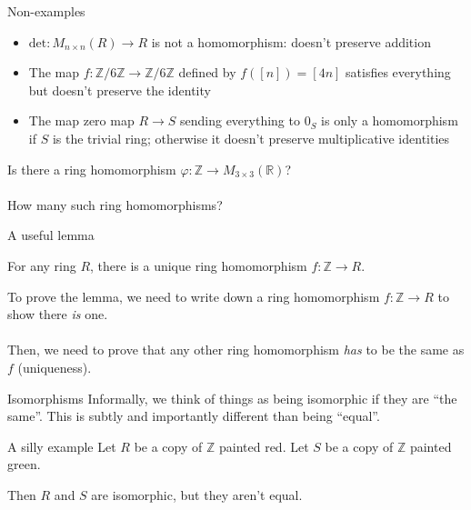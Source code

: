 \documentclass{beamer}
\newcommand{\Z}{\mathbb{Z}}
\newcommand{\R}{\mathbb{R}}
\begin{document}
\begin{frame}{Non-examples}
  \begin{itemize}
  \item $\text{det}: M_{n\times n}(R)\to R$ is not a homomorphism: doesn't preserve addition
  \item The map $f:\Z/6\Z\to \Z/6\Z$ defined by $f([n])=[4n]$ satisfies everything but doesn't preserve the identity
    \item The map zero map $R\to S$ sending everything to $0_S$ is only a homomorphism if $S$ is the trivial ring; otherwise it doesn't preserve multiplicative identities
\end{itemize}
  \end{frame}
\begin{frame}[plain,c]

\begin{center}

\Huge

Is there a ring homomorphism $\varphi:\Z\to M_{3\times 3}(\R)$? \\~\\

How many such ring homomorphisms?
\end{center}

\end{frame}

\begin{frame}{A useful lemma}

  \begin{lemma} For any ring $R$, there is a unique ring homomorphism $f:\Z\to R$.
  \end{lemma}

  To prove the lemma, we need to write down a ring homomorphism $f:\Z\to R$ to show there \emph{is} one. \\~\\

  Then, we need to prove that any other ring homomorphism \emph{has} to be the same as $f$ (uniqueness).
  \end{frame}

\begin{frame}{Isomorphisms}
Informally, we think of things as being isomorphic if they are ``the same''.  This is subtly and importantly different than being ``equal''.  


\begin{block}{A silly example}
  Let {\color{red} $R$} be a copy of {\color{red} $\Z$} painted {\color{red}red}.
  Let {\color{green}$S$} be a copy of {\color{green}$\Z$} painted {\color{green}green}.

  Then {\color{red}$R$} and {\color{green}$S$} are isomorphic, but they aren't equal.
  \end{block}

\end{frame}
\end{document}

